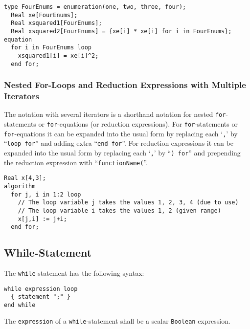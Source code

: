 \begin{example}
\begin{lstlisting}[language=modelica]
  type FourEnums = enumeration(one, two, three, four);
  Real xe[FourEnums];
  Real xsquared1[FourEnums];
  Real xsquared2[FourEnums] = {xe[i] * xe[i] for i in FourEnums};
equation
  for i in FourEnums loop
    xsquared1[i] = xe[i]^2;
  end for;
\end{lstlisting}
\end{example}

\subsubsection{Nested For-Loops and Reduction Expressions with Multiple Iterators}\label{nested-for-loops-and-reduction-expressions-with-multiple-iterators}

The notation with several iterators is a shorthand notation for nested \lstinline!for!-statements or \lstinline!for!-equations (or reduction expressions).
For \lstinline!for!-statements or \lstinline!for!-equations it can be expanded into the usual form by replacing each `\lstinline!,!' by ``\lstinline!loop for!'' and adding extra ``\lstinline!end for!''.
For reduction expressions it can be expanded into the usual form by replacing each `\lstinline!,!' by ``\lstinline!) for!'' and prepending the reduction expression with ``\lstinline!functionName(!''.

\begin{example}
\begin{lstlisting}[language=modelica]
  Real x[4,3];
algorithm
  for j, i in 1:2 loop
    // The loop variable j takes the values 1, 2, 3, 4 (due to use)
    // The loop variable i takes the values 1, 2 (given range)
    x[j,i] := j+i;
  end for;
\end{lstlisting}
\end{example}

\subsection{While-Statement}\label{while-statement}

The \lstinline!while!-statement has the following syntax:
\begin{lstlisting}[language=grammar]
while expression loop
  { statement ";" }
end while
\end{lstlisting}
The \lstinline!expression! of a \lstinline!while!-statement shall be a scalar \lstinline!Boolean! expression.

